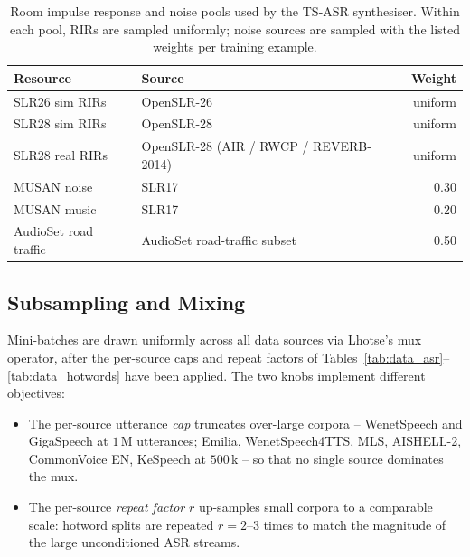 \begin{table}[t]
  \caption{Room impulse response and noise pools used by the TS-ASR
    synthesiser. Within each pool, RIRs are sampled uniformly; noise
    sources are sampled with the listed weights per training example.}
  \label{tab:data_rir_noise}
  \centering
  \small
  \begin{tabular}{p{4.0cm}p{6.0cm}r}
    \toprule
    Resource & Source & Weight \\
    \midrule
    SLR26 sim RIRs       & OpenSLR-26 \cite{ko2017studyrir}                            & uniform \\
    SLR28 sim RIRs       & OpenSLR-28 \cite{ko2017studyrir}                            & uniform \\
    SLR28 real RIRs      & OpenSLR-28 (AIR / RWCP / REVERB-2014) \cite{ko2017studyrir} & uniform \\
    \midrule
    MUSAN noise          & SLR17 \cite{snyder2015musan}                                & 0.30 \\
    MUSAN music          & SLR17 \cite{snyder2015musan}                                & 0.20 \\
    AudioSet road traffic & AudioSet road-traffic subset                               & 0.50 \\
    \bottomrule
  \end{tabular}
\end{table}

\subsection{Subsampling and Mixing}
\label{subsec:mixing}

Mini-batches are drawn uniformly across all data sources via Lhotse's
mux operator, after the per-source caps and repeat factors of
Tables~\ref{tab:data_asr}--\ref{tab:data_hotwords} have been applied.
The two knobs implement different objectives:

\begin{itemize}
  \item The per-source utterance \emph{cap} truncates over-large
        corpora -- WenetSpeech and GigaSpeech at $1\,$M utterances;
        Emilia, WenetSpeech4TTS, MLS, AISHELL-2, CommonVoice EN,
        KeSpeech at $500\,$k -- so that no single source dominates
        the mux.
  \item The per-source \emph{repeat factor} $r$ up-samples small
        corpora to a comparable scale: hotword splits are repeated
        $r{=}2$--$3$ times to match the magnitude of the large
        unconditioned ASR streams.
\end{itemize}

